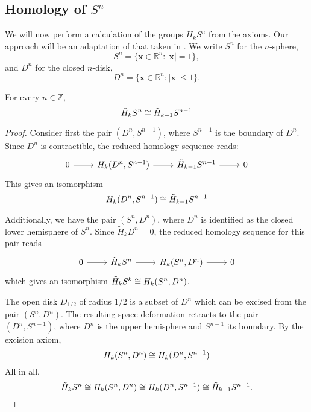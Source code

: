 \subsection{Homology of $S^{n}$}
We will now perform a calculation of the groups $H_kS^{n}$ from the axioms. Our approach will be an adaptation of that taken in \cite{Werndli}. We write $S^n$ for the $n$-sphere, $$S^n=\{\mathbf{x}\in \mathbb{R}^n:|\mathbf{x}|=1\},$$ and $D^n$ for the closed $n$-disk, 
$$D^n=\{\mathbf{x}\in \mathbb{R}^n:|\mathbf{x}|\leq1\}.$$

\begin{lemma}\label{sphere-isomorphism} For every $n\in \mathbb{Z}$,
$$\tilde{H}_kS^n\cong \tilde{H}_{k-1}S^{n-1}$$
\end{lemma}
\begin{proof}
Consider first the pair $(D^n,S^{n-1})$, where $S^{n-1}$ is the boundary of $D^n$. Since $D^n$ is contractible, the reduced homology sequence reads:
\[\begin{tikzcd}
 0 \arrow[r] & {H_k(D^n,S^{n-1})} \arrow[r] & \tilde{H}_{k-1}S^{n-1} \arrow[r] & 0 
\end{tikzcd}\]
This gives an isomorphism
$$H_k(D^n,S^{n-1})\cong \tilde{H}_{k-1}S^{n-1}$$

Additionally, we have the pair $(S^n,D^n)$, where $D^n$ is identified as the closed lower hemisphere of $S^n$. Since $\tilde{H}_kD^n=0$, the reduced homology sequence for this pair reads
\[\begin{tikzcd}
0 \arrow[r] & \tilde{H}_kS^n \arrow[r] & {H_k(S^n,D^n)} \arrow[r] & 0
\end{tikzcd}\]
which gives an isomorphism $\tilde{H}_kS^k\cong H_k(S^n,D^n)$.

The open disk $D_{1/2}$ of radius $1/2$ is a subset of $D^n$ which can be excised from the pair $(S^n,D^n)$. The resulting space deformation retracts to the pair $(D^n,S^{n-1})$, where $D^n$ is the upper hemisphere and $S^{n-1}$ its boundary. By the excision axiom,
$$H_k (S^n,D^n)\cong H_k(D^n,S^{n-1})$$
All in all,
$$\tilde{H}_kS^n\cong H_k (S^n,D^n)\cong H_k(D^n,S^{n-1})\cong \tilde{H}_{k-1}S^{n-1}.$$


\end{proof}

